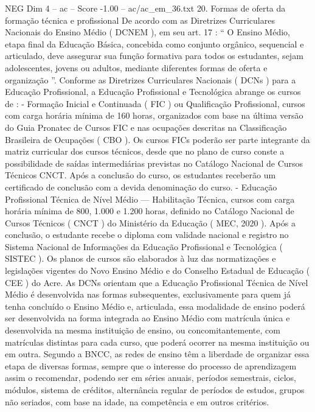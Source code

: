 \begin{textsample}{NEG Dim 4 – ac – Score -1.00 – ac/ac\_em\_36.txt}  \label{ex:f4_neg_050}
20.
Formas de oferta da formação técnica e profissional De acordo com as Diretrizes Curriculares Nacionais do Ensino Médio ( DCNEM ), em seu art. 17 : “ O Ensino Médio, etapa final da Educação Básica, concebida como conjunto orgânico, sequencial e articulado, deve assegurar sua função formativa para todos os estudantes, sejam adolescentes, jovens ou adultos, mediante diferentes formas de oferta e organização ”.
Conforme as Diretrizes Curriculares Nacionais ( DCNs ) para a Educação Profissional, a Educação Profissional e Tecnológica abrange os cursos de : - Formação Inicial e Continuada ( FIC ) ou Qualificação Profissional, cursos com carga horária mínima de 160 horas, organizados com base na última versão do Guia Pronatec de Cursos FIC e nas ocupações descritas na Classificação Brasileira de Ocupações ( CBO ).
Os cursos FICs poderão ser parte integrante da matriz curricular dos cursos técnicos, desde que no plano de curso conste a possibilidade de saídas intermediárias previstas no Catálogo Nacional de Cursos Técnicos CNCT.
Após a conclusão do curso, os estudantes receberão um certificado de conclusão com a devida denominação do curso. - Educação Profissional Técnica de Nível Médio — Habilitação Técnica, cursos com carga horária mínima de 800, 1.000 e 1.200 horas, definido no Catálogo Nacional de Cursos Técnicos ( CNCT ) do Ministério da Educação ( MEC, 2020 ).
Após a conclusão, o estudante recebe o diploma com validade nacional e registro no Sistema Nacional de Informações da Educação Profissional e Tecnológica ( SISTEC ).
Os planos de cursos são elaborados à luz das normatizações e legislações vigentes do Novo Ensino Médio e do Conselho Estadual de Educação ( CEE ) do Acre.
As DCNs orientam que a Educação Profissional Técnica de Nível Médio é desenvolvida nas formas subsequentes, exclusivamente para quem já tenha concluído o Ensino Médio e, articulada, essa modalidade de ensino poderá ser desenvolvida na forma integrada ao Ensino Médio com matrícula única e desenvolvida na mesma instituição de ensino, ou concomitantemente, com matrículas distintas para cada curso, que poderá ocorrer na mesma instituição ou em outra.
Segundo a BNCC, as redes de ensino têm a liberdade de organizar essa etapa de diversas formas, sempre que o interesse do processo de aprendizagem assim o recomendar, podendo ser em séries anuais, períodos semestrais, ciclos, módulos, sistema de créditos, alternância regular de períodos de estudos, grupos não seriados, com base na idade, na competência e em outros critérios.

\end{textsample}
